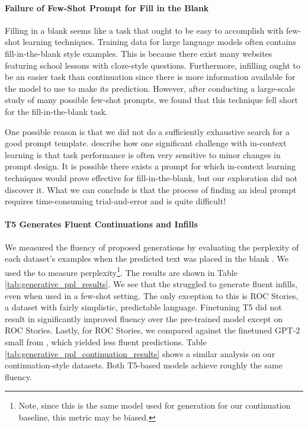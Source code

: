 \paragraph{Failure of Few-Shot Prompt for Fill in the Blank}
Filling in a blank seems like a task that ought to be easy to accomplish with few-shot learning techniques.
Training data for large language models often contains fill-in-the-blank style examples.
This is because there exist many websites featuring school lessons with cloze-style questions.
Furthermore, infilling ought to be an easier task than continuation since there is more information available for the model to use to make its prediction.
However, after conducting a large-scale study of many possible few-shot prompts, we found that this technique fell short for the fill-in-the-blank task.

One possible reason is that we did not do a sufficiently exhaustive search for a good prompt template.
\citet{zhao2021calibrate} describe how one significant challenge with in-context learning is that task performance is often very sensitive to minor changes in prompt design.
It is possible there exists a prompt for which in-context learning techniques would prove effective for fill-in-the-blank, but our exploration did not discover it.
What we can conclude is that the process of finding an ideal prompt requires time-consuming trial-and-error and is quite difficult!


\paragraph{T5 Generates Fluent Continuations and Infills}
We measured the fluency of proposed generations by evaluating the perplexity of each dataset's examples when the predicted text was placed in the blank \citep{donahue2020enabling}.
We used the \LLM{} to measure perplexity\footnote{Note, since this is the same model used for generation for our continuation baseline, this metric may be biased.}.
The results are shown in Table \ref{tab:generative_ppl_results}.
We see that the \LLM{} struggled to generate fluent infills, even when used in a few-shot setting.
The only exception to this is ROC Stories, a dataset with fairly simplistic, predictable language.
Finetuning T5 did not result in significantly improved fluency over the pre-trained model except on ROC Stories. 
Lastly, for ROC Stories, we compared against the finetuned GPT-2 small from \citet{donahue2020enabling}, which yielded less fluent predictions.
Table \ref{tab:generative_ppl_continuation_results} shows a similar analysis on our continuation-style datasets. Both T5-based models achieve roughly the same fluency. 

